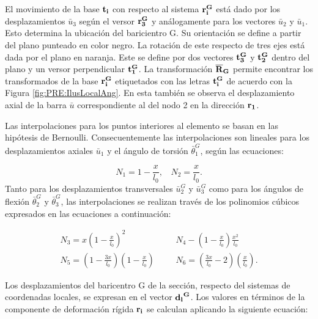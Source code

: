 El movimiento de la base $\bf{t_i}$ con respecto al sistema $\bf{r_i^G}$ está dado por los desplazamientos  $\bar{u}_3$ según el versor  $\bf{r_3^G}$ y análogamente para los vectores $\bar{u}_2$ y $\bar{u}_1$. Esto determina la ubicación del baricientro G. Su orientación se define a partir del plano punteado en color negro. La rotación de este respecto de tres ejes está dada por el plano en naranja. Este se define por dos vectores $\bf{t_3^G}$ y $\bf{t_2^G}$ dentro del plano y un versor perpendicular $\bf{t_1^G}$. La transformación $\bf{\overline{R}}_G$ permite encontrar  los transformados de la base $\bf{r_i^G}$ etiquetados con las letras $\bf{t_i^G}$ de acuerdo con la Figura \ref{fig:PRE:IlusLocalAng}. En esta también se observa el desplazamiento axial de la barra $\bar{u}$ correspondiente al del nodo 2 en la dirección $\bf{r_1}$.

Las interpolaciones para los puntos interiores al elemento se basan en las hipótesis de Bernoulli. Consecuentemente las interpolaciones son lineales para los desplazamientos axiales $\bar{u}_1$ y el ángulo de torsión $\bar{\theta}_1^G$, según las ecuaciones:

\begin{equation}
    \label{Eqn:PRE:FuncInterpol1}
	N_1 = 1 - \frac{x}{l_0},   		~~~~ 	N_2= \frac{x}{l_0}.
\end{equation}
Tanto para los desplazamientos transversales $\bar{u}_2^G$ y $\bar{u}_3^G$  como para los ángulos de flexión $\bar{\theta}_2^G$ y $\bar{\theta}_3^G$, las interpolaciones se realizan través de los polinomios cúbicos expresados en las ecuaciones a continuación:

\begin{eqnarray}
 		\label{Eqn:PRE:FuncInterpol2}
 		N_3 = x\left(1 - \frac{x}{l_0}\right)^2 	&~~~~&  N_4 - \left( 1 - \frac{x}{l_0} \right ) \frac{x^2}{l_0} \\
 		\label{Eqn:PRE:FuncInterpol3}
 		N_5 = \left(1 - \frac{3x}{l_0}\right) \left(1 - \frac{x}{l_0}\right) 	&~~~~&  N_6 =\left( \frac{3x}{l_0}-2\right) \left(\frac{x}{l_0}\right).
\end{eqnarray}

Los desplazamientos del baricentro G de la sección, respecto del sistemas de coordenadas locales, se expresan en el vector $\bf{d_l}^G$. Los valores en términos de la componente de deformación rígida $\bf{r_i}$ se calculan aplicando la siguiente ecuación:

